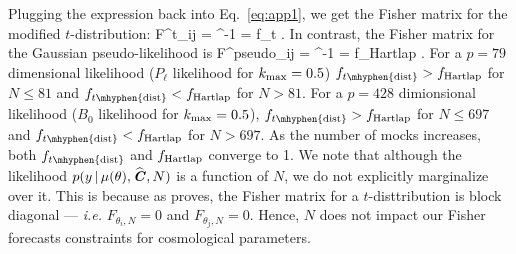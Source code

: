 Plugging the expression back into Eq.~\ref{eq:app1}, we get the Fisher matrix for the modified $t$-distribution: 
\beq
F^{t}_{ij} = \estC^{-1} 
= f_{t} .
\eeq
In contrast, the Fisher matrix for the Gaussian pseudo-likelihood is 
\beq
F^{\rm pseudo}_{ij} = \estC^{-1}
= f_{\rm Hartlap} .
\eeq
For a $p{=}79$ dimensional likelihood ($P_\ell$ likelihood for $k_{\rm max} = 0.5$) 
$f_{t\mhyphen{\rm dist}} > f_{\rm Hartlap}$ for $N \le 81$ 
and $f_{t\mhyphen{\rm dist}} < f_{\rm Hartlap}$ for $N > 81$. For a $p{=}428$ 
dimionsional likelihood ($B_0$ likelihood for $k_{\rm max} = 0.5$), 
$f_{t\mhyphen{\rm dist}} > f_{\rm Hartlap}$ for $N \le 697$ and 
$f_{t\mhyphen{\rm dist}} < f_{\rm Hartlap}$ for $N > 697$. As the number of mocks 
increases, both $f_{t\mhyphen{\rm dist}}$ and $f_{\rm Hartlap}$ converge to 1. 
We note that although the likelihood $p(y \,|\, \mu(\theta),\widehat{\textbf{\textit{C}}},N)$ is a 
function of $N$, we do not explicitly marginalize over it. This is because as 
\cite{lange1989} proves, the Fisher matrix for a $t$-disttribution is block 
diagonal --- \emph{i.e.} $F_{\theta_i, N} = 0$ and $F_{\theta_j, N} = 0$. 
Hence, $N$ does not impact our Fisher forecasts constraints for cosmological 
parameters. 


